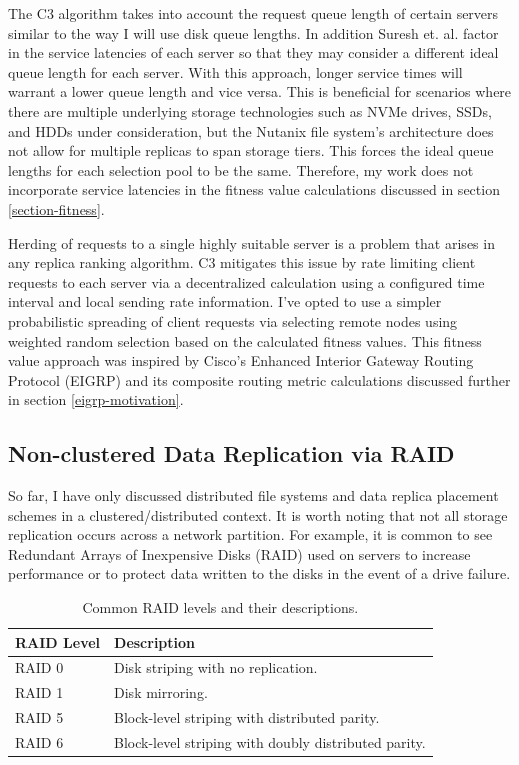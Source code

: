 \documentclass[12pt]{article}
\begin{document}
  The C3 algorithm takes into account the request queue length of certain
  servers similar to the way I will use disk queue lengths. In addition Suresh
  et. al.  factor in the service latencies of each server so that they may
  consider a different ideal queue length for each server. With this approach,
  longer service times will warrant a lower queue length and vice versa. This
  is beneficial for scenarios where there are multiple underlying storage
  technologies such as NVMe drives, SSDs, and HDDs under consideration, but the
  Nutanix file system's architecture does not allow for multiple replicas to
  span storage tiers. This forces the ideal queue lengths for each selection
  pool to be the same. Therefore, my work does not incorporate service
  latencies in the fitness value calculations discussed in section
  \ref{section-fitness}.

  Herding of requests to a single highly suitable server is a problem that
  arises in any replica ranking algorithm. C3 mitigates this issue by rate
  limiting client requests to each server via a decentralized calculation using
  a configured time interval and local sending rate information. I've opted to
  use a simpler probabilistic spreading of client requests via selecting remote
  nodes using weighted random selection based on the calculated fitness values.
  This fitness value approach was inspired by Cisco's Enhanced Interior Gateway
  Routing Protocol (EIGRP) \cite{eigrp} and its composite routing metric
  calculations discussed further in section \ref{eigrp-motivation}.

  \subsection{Non-clustered Data Replication via RAID}

  So far, I have only discussed distributed file systems and data replica
  placement schemes in a clustered/distributed context. It is worth noting
  that not all storage replication occurs across a network partition. For
  example, it is common to see Redundant Arrays of Inexpensive Disks (RAID)
  \cite{raid} \cite{raid2} used on servers to increase performance or to
  protect data written to the disks in the event of a drive failure.

  \begin{table}[htbp]
    \caption{Common RAID levels and their descriptions.}
    \label{tbl:raid-levels}
    \begin{center}
    \begin{tabular}{ | l | l | }
      \hline
      \textbf{RAID Level} & \textbf{Description} \\ \hline
      RAID 0 & Disk striping with no replication. \\ \hline
      RAID 1 & Disk mirroring. \\ \hline
      RAID 5 & Block-level striping with distributed parity. \\ \hline
      RAID 6 & Block-level striping with doubly distributed parity. \\ \hline
      \hline
    \end{tabular}
    \end{center}
  \end{table}
\end{document}
